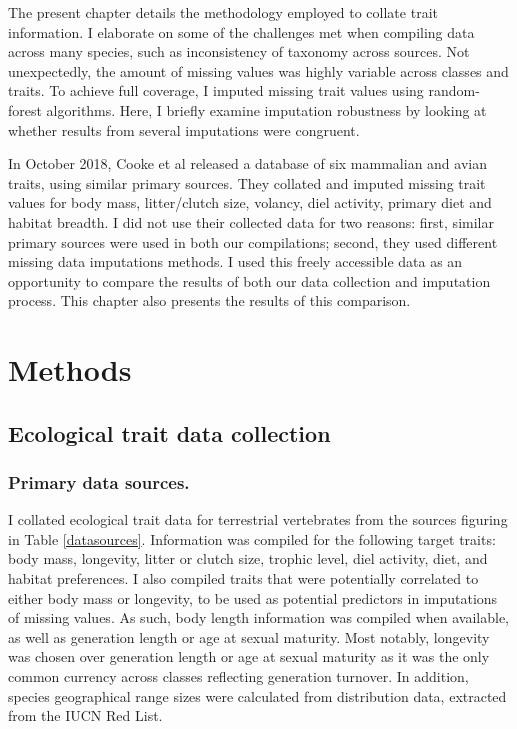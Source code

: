 
The present chapter details the methodology employed to collate trait information. I elaborate on some of the challenges met when compiling data across many species, such as inconsistency of taxonomy across sources. Not unexpectedly, the amount of missing values was highly variable across classes and traits. To achieve full coverage, I imputed missing trait values using random-forest algorithms. Here, I briefly examine imputation robustness by looking at whether results from several imputations were congruent. 

In October 2018, Cooke et al released a database of six mammalian and avian traits, using similar primary sources. They collated and imputed missing trait values for body mass, litter/clutch size, volancy, diel activity, primary diet and habitat breadth. I did not use their collected data for two reasons: first, similar primary sources were used in both our compilations; second, they used different missing data imputations methods. I used this freely accessible data as an opportunity to compare the results of both our data collection and imputation process. This chapter also presents the results of this comparison.



\pagebreak
\section{Methods}

\subsection{Ecological trait data collection}

\subsubsection{Primary data sources.}
I collated ecological trait data for terrestrial vertebrates from the sources figuring in Table \ref{datasources}. Information was compiled for the following target traits: body mass, longevity, litter or clutch size, trophic level, diel activity, diet, and habitat preferences. I also compiled traits that were potentially correlated to either body mass or longevity, to be used as potential predictors in imputations of missing values. As such, body length information was compiled when available, as well as generation length or age at sexual maturity. Most notably, longevity was chosen over generation length or age at sexual maturity as it was the only common currency across classes reflecting generation turnover. In addition, species geographical range sizes were calculated from distribution data, extracted from the IUCN Red List.


